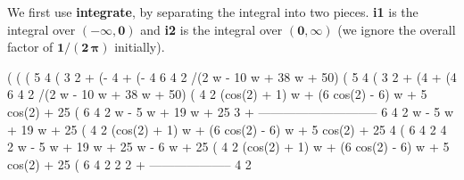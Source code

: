\documentclass[12pt]{article}
\begin{document}
\noindent We first use \textbf{integrate}, by separating the integral into two pieces.
\textbf{i1} is the integral over $\mathbf{(-\infty,0)}$ and \textbf{i2} is the integral
  over $\mathbf{(0,\infty)}$ (we ignore the overall factor of $\mathbf{1/(2\,\boldsymbol{\pi}) }$
  initially).
\begin{myVerbatim}
(%
(%
(%
                           5                              4
(%
                                         3                              2
 + (- 4 %
 + (- 4 %
     6       4       2
/(2 w  - 10 w  + 38 w  + 50)
(%
                         5                              4
(%
                                       3                              2
 + (4 %
 + (4 %
     6       4       2
/(2 w  - 10 w  + 38 w  + 50)
(%
                    4                   2
      (cos(2) + 1) w  + (6 cos(2) - 6) w  + 5 cos(2) + 25
(%
                     6      4       2
                    w  - 5 w  + 19 w  + 25
                                                                3
                                                + -----------------------------
                                                      6      4       2
                                                     w  - 5 w  + 19 w  + 25
(%
                    4                   2
      (cos(2) + 1) w  + (6 cos(2) - 6) w  + 5 cos(2) + 25   4 %
(%
                     6      4       2                        4      2
                    w  - 5 w  + 19 w  + 25                  w  - 6 w  + 25
(%
                    4                   2
      (cos(2) + 1) w  + (6 cos(2) - 6) w  + 5 cos(2) + 25
(%
                        6      4       2
                2 %
                                                              2 %
                                                         + --------------------
                                                                 4      2
\end{myVerbatim}
\end{document}
